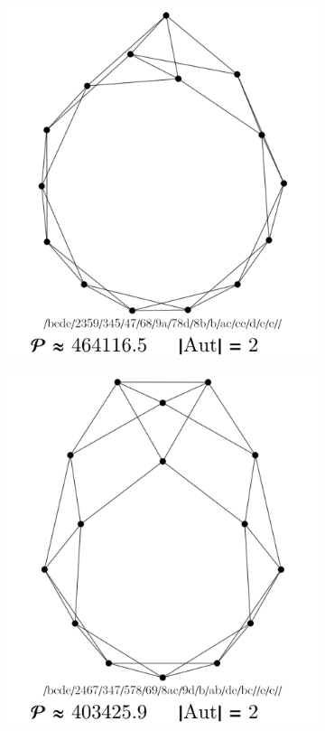 \documentclass[11pt,a4paper]{article}
\renewcommand{\|}{\rule[-0.4ex]{0.2ex}{1.2em}}
\begin{document}
\begin{figure}[htb]
\begin{subfigure}[b]{.24 \textwidth}
		\subcaption{}
	\end{subfigure}
	\begin{subfigure}[b]{.24 \textwidth}
		\includegraphics[width=\linewidth]{largest_13_3}
		\subcaption{}
	\end{subfigure}
	\begin{subfigure}[b]{.24 \textwidth}
		\includegraphics[width=\linewidth]{largest_13_4}
		\subcaption{}
	\end{subfigure}
	

\end{figure}
\end{document}
